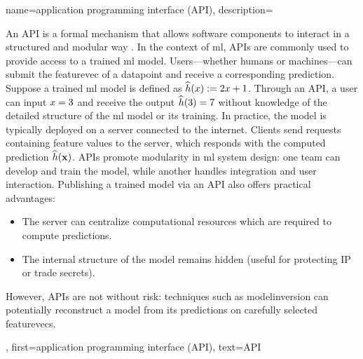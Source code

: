 {name={application programming interface (API)},
		description={
			An  API is a formal mechanism that 
			allows software components to interact in a structured and modular way \cite{RestfulBook2013}.
			In the context of \gls{ml}, APIs are commonly used to provide access to a trained \gls{ml} \gls{model}. 
			Users—whether humans or machines—can submit the \gls{featurevec} of a \gls{datapoint} and receive 
			a corresponding \gls{prediction}. Suppose a trained \gls{ml} \gls{model} is defined 
			as $\widehat{h}(x) := 2 x + 1$. Through an API, a user 
			can input $x = 3$ and receive the output $\widehat{h}(3) = 7$ 
			without knowledge of the detailed structure of the \gls{ml} \gls{model} or its training. 
			In practice, the \gls{model} is typically deployed on a server connected to the internet. 
			Clients send requests containing \gls{feature} values to the server, which responds with 
			the computed prediction $\widehat{h}({\bf x})$. APIs promote modularity 
			in \gls{ml} system design: one team can develop and train the model, while another 
			handles integration and user interaction. Publishing a trained \gls{model} via an API also 
			offers practical advantages: 
			\begin{itemize} 
				\item The server can centralize computational resources which are required to compute \gls{prediction}s. 
		        \item The internal structure of the \gls{model} remains hidden (useful for protecting IP or trade secrets). 
		    \end{itemize} 
			However, APIs are not without risk: techniques such as \gls{modelinversion} can potentially reconstruct a 
			\gls{model} from its \gls{prediction}s on carefully selected \gls{featurevec}s. 
			},
		first={application programming interface (API)},
		text={API}
}





